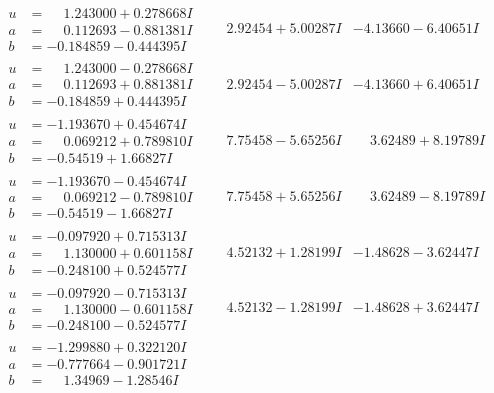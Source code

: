 \documentclass[1p]{elsarticle_modified}
\theoremstyle{definition}
\begin{document}
$$\begin{array}{c|c|c}
\begin{aligned}
u &= \phantom{-}1.243000 + 0.278668 I \\
a &= \phantom{-}0.112693 - 0.881381 I \\
b &= -0.184859 - 0.444395 I\end{aligned}
 & \phantom{-}2.92454 + 5.00287 I & -4.13660 - 6.40651 I \\ \hline\begin{aligned}
u &= \phantom{-}1.243000 - 0.278668 I \\
a &= \phantom{-}0.112693 + 0.881381 I \\
b &= -0.184859 + 0.444395 I\end{aligned}
 & \phantom{-}2.92454 - 5.00287 I & -4.13660 + 6.40651 I \\ \hline\begin{aligned}
u &= -1.193670 + 0.454674 I \\
a &= \phantom{-}0.069212 + 0.789810 I \\
b &= -0.54519 + 1.66827 I\end{aligned}
 & \phantom{-}7.75458 - 5.65256 I & \phantom{-}3.62489 + 8.19789 I \\ \hline\begin{aligned}
u &= -1.193670 - 0.454674 I \\
a &= \phantom{-}0.069212 - 0.789810 I \\
b &= -0.54519 - 1.66827 I\end{aligned}
 & \phantom{-}7.75458 + 5.65256 I & \phantom{-}3.62489 - 8.19789 I \\ \hline\begin{aligned}
u &= -0.097920 + 0.715313 I \\
a &= \phantom{-}1.130000 + 0.601158 I \\
b &= -0.248100 + 0.524577 I\end{aligned}
 & \phantom{-}4.52132 + 1.28199 I & -1.48628 - 3.62447 I \\ \hline\begin{aligned}
u &= -0.097920 - 0.715313 I \\
a &= \phantom{-}1.130000 - 0.601158 I \\
b &= -0.248100 - 0.524577 I\end{aligned}
 & \phantom{-}4.52132 - 1.28199 I & -1.48628 + 3.62447 I \\ \hline\begin{aligned}
u &= -1.299880 + 0.322120 I \\
a &= -0.777664 - 0.901721 I \\
b &= \phantom{-}1.34969 - 1.28546 I\end{aligned}

\end{array}$$
\end{document}
